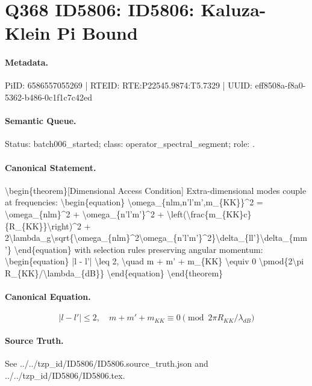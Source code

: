 \section*{Q368 ID5806: ID5806: Kaluza-Klein Pi Bound}
\paragraph{Metadata.}
PiID: 6586557055269 | RTEID: RTE:P22545.9874:T5.7329 | UUID: eff8508a-f8a0-5362-b486-0c1f1c7c42ed

\paragraph{Semantic Queue.}
Status: batch006\_started; class: operator\_spectral\_segment; role: .

\paragraph{Canonical Statement.}
\textbackslash{}begin\{theorem\}[Dimensional Access Condition] Extra-dimensional modes couple at frequencies: \textbackslash{}begin\{equation\} \textbackslash{}omega\_\{nlm,n'l'm',m\_\{KK\}\}\textasciicircum{}2 = \textbackslash{}omega\_\{nlm\}\textasciicircum{}2 + \textbackslash{}omega\_\{n'l'm'\}\textasciicircum{}2 + \textbackslash{}left(\textbackslash{}frac\{m\_\{KK\}c\}\{R\_\{KK\}\}\textbackslash{}right)\textasciicircum{}2 + 2\textbackslash{}lambda\_g\textbackslash{}sqrt\{\textbackslash{}omega\_\{nlm\}\textasciicircum{}2\textbackslash{}omega\_\{n'l'm'\}\textasciicircum{}2\}\textbackslash{}delta\_\{ll'\}\textbackslash{}delta\_\{mm'\} \textbackslash{}end\{equation\} with selection rules preserving angular momentum: \textbackslash{}begin\{equation\} |l - l'| \textbackslash{}leq 2, \textbackslash{}quad m + m' + m\_\{KK\} \textbackslash{}equiv 0 \textbackslash{}pmod\{2\textbackslash{}pi R\_\{KK\}/\textbackslash{}lambda\_\{dB\}\} \textbackslash{}end\{equation\} \textbackslash{}end\{theorem\}

\paragraph{Canonical Equation.}
\[
\begin{equation} |l - l'| \leq 2, \quad m + m' + m_{KK} \equiv 0 \pmod{2\pi R_{KK}/\lambda_{dB}} \end{equation}
\]

\paragraph{Source Truth.}
See ../../tzp\_id/ID5806/ID5806.source\_truth.json and ../../tzp\_id/ID5806/ID5806.tex.
